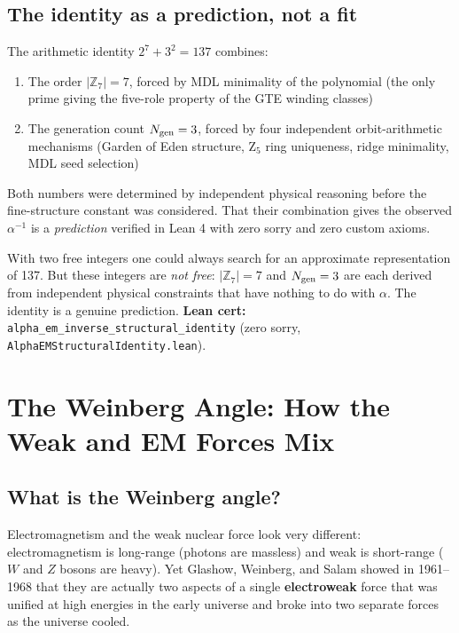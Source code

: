 \documentclass[11pt,a4paper]{article}
\newcommand{\term}[1]{\textbf{#1}}
\newcommand{\ZS}{\mathbb{Z}_7}
\newcommand{\Ngen}{N_{\rm gen}}
\newcommand{\lean}[1]{\texttt{#1}}
\begin{document}
\subsection{The identity as a prediction, not a fit}

The arithmetic identity $2^7 + 3^2 = 137$ combines:
\begin{enumerate}
  \item The order $|\ZS| = 7$, forced by MDL minimality of the polynomial
        (the only prime giving the five-role property of the GTE winding classes)
  \item The generation count $\Ngen = 3$, forced by four independent orbit-arithmetic
        mechanisms (Garden of Eden structure, Z$_5$ ring uniqueness, ridge minimality,
        MDL seed selection)
\end{enumerate}
Both numbers were determined by independent physical reasoning before the fine-structure
constant was considered.  That their combination gives the observed $\alpha^{-1}$ is
a \emph{prediction} verified in Lean 4 with zero sorry and zero custom axioms.

\begin{tcolorbox}[colback=boxyellow,colframe=yellow!60!black,
  title=Why This Is Not Numerology]
With two free integers one could always search for an approximate representation of 137.
But these integers are \emph{not free}: $|\ZS| = 7$ and $\Ngen = 3$ are each
derived from independent physical constraints that have nothing to do with $\alpha$.
The identity is a genuine prediction. \textbf{Lean cert:}
\lean{alpha\_em\_inverse\_structural\_identity} (zero sorry, \texttt{AlphaEMStructuralIdentity.lean}).
\end{tcolorbox}

\section{The Weinberg Angle: How the Weak and EM Forces Mix}

\subsection{What is the Weinberg angle?}

Electromagnetism and the weak nuclear force look very different: electromagnetism
is long-range (photons are massless) and weak is short-range ($W$ and $Z$ bosons
are heavy).  Yet Glashow, Weinberg, and Salam showed in 1961--1968 that they are
actually two aspects of a single \term{electroweak} force that was unified at
high energies in the early universe and broke into two separate forces as the
universe cooled.
\end{document}
